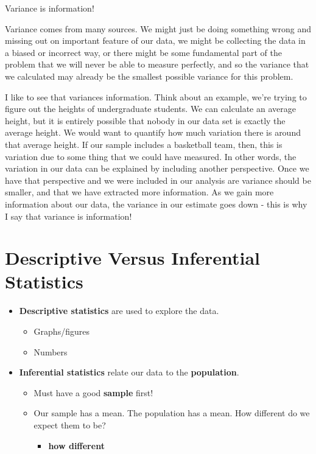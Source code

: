 \documentclass[
  letterpaper,
  DIV=11,
  numbers=noendperiod]{scrreprt}
\providecommand{\tightlist}{%
  \setlength{\itemsep}{0pt}\setlength{\parskip}{0pt}}\usepackage{longtable,booktabs,array}
\begin{document}
Variance is information!

Variance comes from many sources. We might just be doing something wrong
and missing out on important feature of our data, we might be collecting
the data in a biased or incorrect way, or there might be some
fundamental part of the problem that we will never be able to measure
perfectly, and so the variance that we calculated may already be the
smallest possible variance for this problem.

I like to see that variances information. Think about an example, we're
trying to figure out the heights of undergraduate students. We can
calculate an average height, but it is entirely possible that nobody in
our data set is exactly the average height. We would want to quantify
how much variation there is around that average height. If our sample
includes a basketball team, then, this is variation due to some thing
that we could have measured. In other words, the variation in our data
can be explained by including another perspective. Once we have that
perspective and we were included in our analysis are variance should be
smaller, and that we have extracted more information. As we gain more
information about our data, the variance in our estimate goes down -
this is why I say that variance is information!

\hypertarget{descriptive-versus-inferential-statistics}{%
\section{Descriptive Versus Inferential
Statistics}\label{descriptive-versus-inferential-statistics}}

\begin{itemize}
\tightlist
\item
  \textbf{Descriptive statistics} are used to explore the data.

  \begin{itemize}
  \tightlist
  \item
    Graphs/figures
  \item
    Numbers\lspace
  \end{itemize}
\item
  \textbf{Inferential statistics} relate our data to the
  \textbf{population}.

  \begin{itemize}
  \tightlist
  \item
    Must have a good \textbf{sample} first!
  \item
    Our sample has a mean. The population has a mean. How different do
    we expect them to be?

    \begin{itemize}
    \tightlist
    \item
      \textbf{how different}
    \end{itemize}
  \end{itemize}
\end{itemize}
\end{document}

